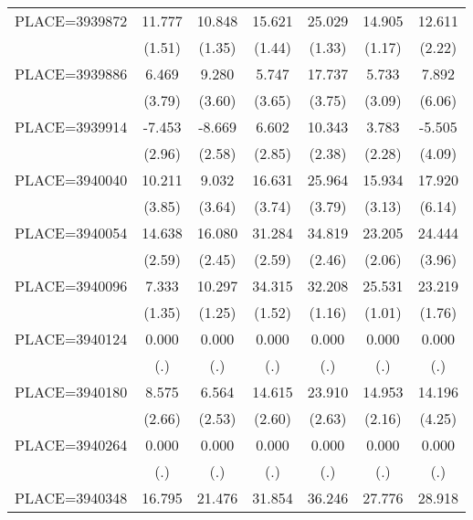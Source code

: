 {\begin{tabular}{l*{6}{c}}
PLACE=3939872       &      11.777&      10.848&      15.621&      25.029&      14.905&      12.611\\
                    &      (1.51)&      (1.35)&      (1.44)&      (1.33)&      (1.17)&      (2.22)\\
PLACE=3939886       &       6.469&       9.280&       5.747&      17.737&       5.733&       7.892\\
                    &      (3.79)&      (3.60)&      (3.65)&      (3.75)&      (3.09)&      (6.06)\\
PLACE=3939914       &      -7.453&      -8.669&       6.602&      10.343&       3.783&      -5.505\\
                    &      (2.96)&      (2.58)&      (2.85)&      (2.38)&      (2.28)&      (4.09)\\
PLACE=3940040       &      10.211&       9.032&      16.631&      25.964&      15.934&      17.920\\
                    &      (3.85)&      (3.64)&      (3.74)&      (3.79)&      (3.13)&      (6.14)\\
PLACE=3940054       &      14.638&      16.080&      31.284&      34.819&      23.205&      24.444\\
                    &      (2.59)&      (2.45)&      (2.59)&      (2.46)&      (2.06)&      (3.96)\\
PLACE=3940096       &       7.333&      10.297&      34.315&      32.208&      25.531&      23.219\\
                    &      (1.35)&      (1.25)&      (1.52)&      (1.16)&      (1.01)&      (1.76)\\
PLACE=3940124       &       0.000&       0.000&       0.000&       0.000&       0.000&       0.000\\
                    &         (.)&         (.)&         (.)&         (.)&         (.)&         (.)\\
PLACE=3940180       &       8.575&       6.564&      14.615&      23.910&      14.953&      14.196\\
                    &      (2.66)&      (2.53)&      (2.60)&      (2.63)&      (2.16)&      (4.25)\\
PLACE=3940264       &       0.000&       0.000&       0.000&       0.000&       0.000&       0.000\\
                    &         (.)&         (.)&         (.)&         (.)&         (.)&         (.)\\
PLACE=3940348       &      16.795&      21.476&      31.854&      36.246&      27.776&      28.918\\

\end{tabular}}
